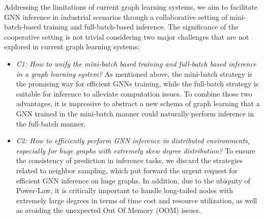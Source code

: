 \documentclass[conference]{IEEEtran}
\begin{document}
Addressing the limitations of current graph learning systems, we aim to facilitate GNN inference in industrial scenarios through a collaborative setting of mini-batch-based training and full-batch-based inference.
The significance of the cooperative setting is not trivial considering two major challenges that are not explored in current graph learning systems:
\begin{itemize}
    \item \emph{C1: How to unify the mini-batch based training and full-batch based inference in a graph learning system?} 
    As mentioned above, the mini-batch strategy is the promising way for efficient GNNs training, while the full-batch strategy is suitable for inference to alleviate computation issues. To combine those two advantages, it is impressive to abstract a new schema of graph learning that a GNN trained in the mini-batch manner could naturally perform inference in the full-batch manner.
    \item \emph{C2: How to efficiently perform GNN inference in distributed environments, especially for huge graphs with extremely skew degree distribution?}
    To ensure the consistency of prediction in inference tasks, we discard the strategies related to neighbor sampling, which put forward the urgent request for efficient GNN inference on huge graphs. In addition, due to the ubiquity of Power-Law, it is critically important to handle long-tailed nodes with extremely large degrees in terms of time cost and resource utilization, as well as avoiding the unexpected Out Of Memory (OOM) issues.
\end{itemize}
\end{document}
